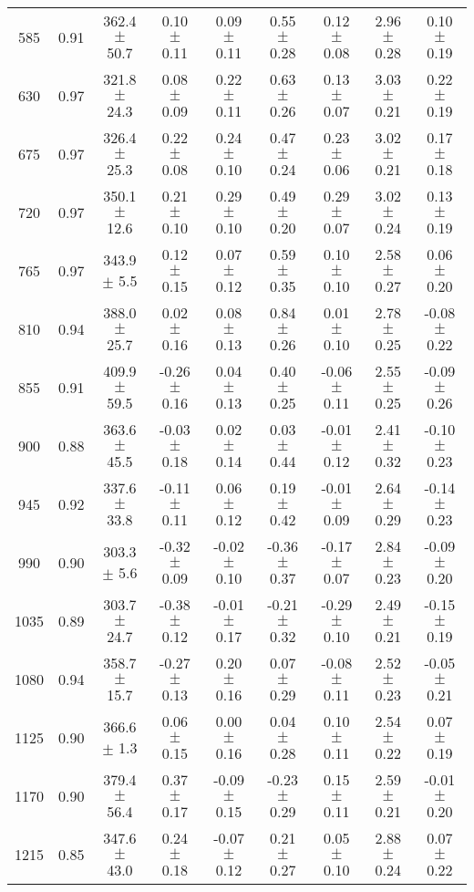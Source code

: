 \documentclass[twocolumn]{aastex61}%
\begin{document}
\begin{table*}[ht]
\begin{tabular}{ccc|ccccc|c}
585 & 0.91 & 362.4 $\pm$ 50.7 & 0.10 $\pm$ 0.11 & 0.09 $\pm$ 0.11 & 0.55 $\pm$ 0.28 & 0.12 $\pm$ 0.08 & 2.96 $\pm$ 0.28 & 0.10 $\pm$ 0.19\\
630 & 0.97 & 321.8 $\pm$ 24.3 & 0.08 $\pm$ 0.09 & 0.22 $\pm$ 0.11 & 0.63 $\pm$ 0.26 & 0.13 $\pm$ 0.07 & 3.03 $\pm$ 0.21 & 0.22 $\pm$ 0.19\\
675 & 0.97 & 326.4 $\pm$ 25.3 & 0.22 $\pm$ 0.08 & 0.24 $\pm$ 0.10 & 0.47 $\pm$ 0.24 & 0.23 $\pm$ 0.06 & 3.02 $\pm$ 0.21 & 0.17 $\pm$ 0.18\\
720 & 0.97 & 350.1 $\pm$ 12.6 & 0.21 $\pm$ 0.10 & 0.29 $\pm$ 0.10 & 0.49 $\pm$ 0.20 & 0.29 $\pm$ 0.07 & 3.02 $\pm$ 0.24 & 0.13 $\pm$ 0.19\\
765 & 0.97 & 343.9 $\pm$ 5.5 & 0.12 $\pm$ 0.15 & 0.07 $\pm$ 0.12 & 0.59 $\pm$ 0.35 & 0.10 $\pm$ 0.10 & 2.58 $\pm$ 0.27 & 0.06 $\pm$ 0.20\\
810 & 0.94 & 388.0 $\pm$ 25.7 & 0.02 $\pm$ 0.16 & 0.08 $\pm$ 0.13 & 0.84 $\pm$ 0.26 & 0.01 $\pm$ 0.10 & 2.78 $\pm$ 0.25 & -0.08 $\pm$ 0.22\\
855 & 0.91 & 409.9 $\pm$ 59.5 & -0.26 $\pm$ 0.16 & 0.04 $\pm$ 0.13 & 0.40 $\pm$ 0.25 & -0.06 $\pm$ 0.11 & 2.55 $\pm$ 0.25 & -0.09 $\pm$ 0.26\\
900 & 0.88 & 363.6 $\pm$ 45.5 & -0.03 $\pm$ 0.18 & 0.02 $\pm$ 0.14 & 0.03 $\pm$ 0.44 & -0.01 $\pm$ 0.12 & 2.41 $\pm$ 0.32 & -0.10 $\pm$ 0.23\\
945 & 0.92 & 337.6 $\pm$ 33.8 & -0.11 $\pm$ 0.11 & 0.06 $\pm$ 0.12 & 0.19 $\pm$ 0.42 & -0.01 $\pm$ 0.09 & 2.64 $\pm$ 0.29 & -0.14 $\pm$ 0.23\\
990 & 0.90 & 303.3 $\pm$ 5.6 & -0.32 $\pm$ 0.09 & -0.02 $\pm$ 0.10 & -0.36 $\pm$ 0.37 & -0.17 $\pm$ 0.07 & 2.84 $\pm$ 0.23 & -0.09 $\pm$ 0.20\\
1035 & 0.89 & 303.7 $\pm$ 24.7 & -0.38 $\pm$ 0.12 & -0.01 $\pm$ 0.17 & -0.21 $\pm$ 0.32 & -0.29 $\pm$ 0.10 & 2.49 $\pm$ 0.21 & -0.15 $\pm$ 0.19\\
1080 & 0.94 & 358.7 $\pm$ 15.7 & -0.27 $\pm$ 0.13 & 0.20 $\pm$ 0.16 & 0.07 $\pm$ 0.29 & -0.08 $\pm$ 0.11 & 2.52 $\pm$ 0.23 & -0.05 $\pm$ 0.21\\
1125 & 0.90 & 366.6 $\pm$ 1.3 & 0.06 $\pm$ 0.15 & 0.00 $\pm$ 0.16 & 0.04 $\pm$ 0.28 & 0.10 $\pm$ 0.11 & 2.54 $\pm$ 0.22 & 0.07 $\pm$ 0.19\\
1170 & 0.90 & 379.4 $\pm$ 56.4 & 0.37 $\pm$ 0.17 & -0.09 $\pm$ 0.15 & -0.23 $\pm$ 0.29 & 0.15 $\pm$ 0.11 & 2.59 $\pm$ 0.21 & -0.01 $\pm$ 0.20\\
1215 & 0.85 & 347.6 $\pm$ 43.0 & 0.24 $\pm$ 0.18 & -0.07 $\pm$ 0.12 & 0.21 $\pm$ 0.27 & 0.05 $\pm$ 0.10 & 2.88 $\pm$ 0.24 & 0.07 $\pm$ 0.22\\

\end{tabular}
\end{table*}
\end{document}
